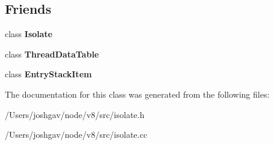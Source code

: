 \subsection*{Friends}
\begin{DoxyCompactItemize}
\item 
class {\bfseries Isolate}\hypertarget{classv8_1_1internal_1_1_isolate_1_1_per_isolate_thread_data_aba4f0964bdacf2bbf62cf876e5d28d0a}{}\label{classv8_1_1internal_1_1_isolate_1_1_per_isolate_thread_data_aba4f0964bdacf2bbf62cf876e5d28d0a}

\item 
class {\bfseries Thread\+Data\+Table}\hypertarget{classv8_1_1internal_1_1_isolate_1_1_per_isolate_thread_data_a27444e20ddf88624d116fc0ebd8c40a9}{}\label{classv8_1_1internal_1_1_isolate_1_1_per_isolate_thread_data_a27444e20ddf88624d116fc0ebd8c40a9}

\item 
class {\bfseries Entry\+Stack\+Item}\hypertarget{classv8_1_1internal_1_1_isolate_1_1_per_isolate_thread_data_a8d448be8b7e8af37a0da5811aef0eebd}{}\label{classv8_1_1internal_1_1_isolate_1_1_per_isolate_thread_data_a8d448be8b7e8af37a0da5811aef0eebd}

\end{DoxyCompactItemize}


The documentation for this class was generated from the following files\+:\begin{DoxyCompactItemize}
\item 
/\+Users/joshgav/node/v8/src/isolate.\+h\item 
/\+Users/joshgav/node/v8/src/isolate.\+cc\end{DoxyCompactItemize}
